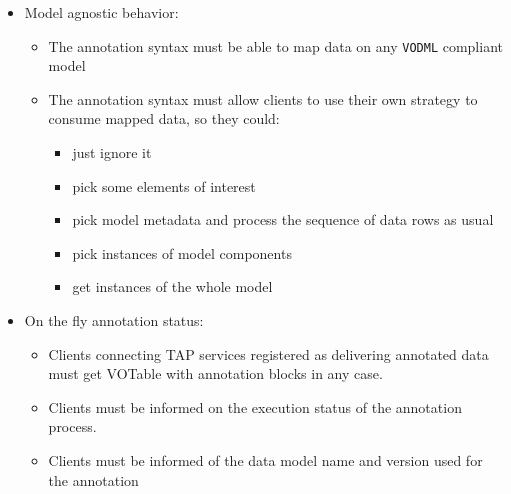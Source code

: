 \begin {itemize}
  \item Model agnostic behavior:
  \begin {itemize}
    \item The annotation syntax must be able to map data on any \texttt{VODML} compliant model
    \item The annotation syntax must allow clients to use their own strategy to consume mapped data, so they could:
      \begin {itemize}
        \item just ignore it
        \item pick some elements of interest 
        \item pick model metadata and process the sequence of data rows as usual
        \item pick instances of model components 
        \item get instances of the whole model  
      \end {itemize}
  \end {itemize}
  
  \item On the fly annotation status:
      \begin {itemize} 
          \item Clients connecting TAP services registered as delivering annotated data must get VOTable with annotation blocks in any case. 
          \item Clients must be informed on the execution status of the annotation process.     
          \item Clients must be informed of the data model name and version used for the annotation  
       \end {itemize}

\end {itemize}
